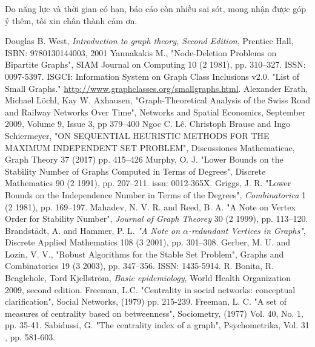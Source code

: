 \documentclass[14pt, oneside, a4paper, openany]{scrartcl}
\begin{document}
Do năng lực và thời gian có hạn, báo cáo còn nhiều sai sót, mong nhận được góp ý thêm, tôi xin chân thành cảm ơn.
\newpage
\printindex
\newpage
\begin{thebibliography}{9}
	Douglas B. West,
	\textit{Introduction to graph theory, Second Edition},
	Prentice Hall, ISBN: 9780130144003, 2001
	Yannakakis M.,
	"Node-Deletion Problems on Bipartite Graphs",
	SIAM Journal on Computing 10 (2 1981), pp. 310–327. ISSN: 0097-5397.
	ISGCI: Information System on Graph Class Inclusions v2.0. "List of Small Graphs." \href{http://www.graphclasses.org/smallgraphs.html}{http://www.graphclasses.org/smallgraphs.html}.
	Alexander Erath, Michael Löchl, Kay W. Axhausen,
	"Graph-Theoretical Analysis of the Swiss Road and Railway Networks Over Time", 
	Networks and Spatial Economics,
	September 2009, Volume 9, Issue 3, pp 379–400
	Ngoc C. Lê. Christoph Brause and Ingo Schiermeyer,
	"ON SEQUENTIAL HEURISTIC METHODS FOR THE MAXIMUM INDEPENDENT SET PROBLEM",
	Discussiones Mathematicae, Graph Theory 37 (2017) pp. 415–426
	Murphy, O. J.
	"Lower Bounds on the Stability Number of Graphs Computed in Terms of Degrees", Discrete Mathematics 90 (2 1991), pp. 207–211. issn: 0012-365X. 
	Griggs, J. R.
	"Lower Bounds on the Independence Number in Terms of the Degrees",
	\textit{Combinatorica} 1 (2 1981), pp. 169–197.
	Mahadev, N. V. R. and Reed, B. A.
	"A Note on Vertex Order for Stability Number",
	\textit{Journal of Graph Theorey} 30 (2 1999), pp. 113–120.
	Brandstädt, A. and Hammer, P. L.
	\textit{"A Note on $\alpha$-redundant Vertices in Graphs"},
	Discrete Applied Mathematics 108 (3 2001), pp. 301–308.
	Gerber, M. U. and Lozin, V. V.,
	"Robust Algorithms for the Stable Set Problem",
	Graphs and Combinatorics 19 (3 2003), pp. 347–356. ISSN: 1435-5914.
	R. Bonita, R. Beaglehole, Tord Kjellström,
	\textit{Basic epidemiology},
	World Health Organization 2009, second edition.
	Freeman, L.C.
	"Centrality in social networks: conceptual clarification",
	Social Networks, (1979) pp. 215-239.
	Freeman, L. C.
	"A set of measures of centrality based on betweenness",
	Sociometry, (1977) Vol. 40, No. 1, pp. 35-41.
	Sabidussi, G. 
	"The centrality index of a graph",
	 Psychometrika, Vol. 31 , pp. 581-603.

\end{thebibliography}
\end{document}
